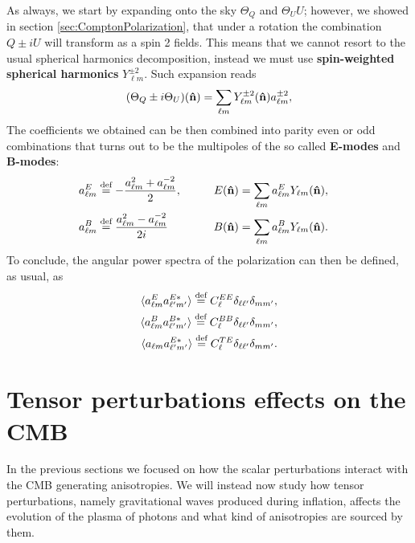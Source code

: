 As always, we start by expanding onto the sky $\Theta_Q$ and $\Theta_UU$; however, we showed in section \ref{sec:ComptonPolarization}, that under a rotation the combination $Q\pm iU$ will transform as a spin 2 fields. This means that we cannot resort to the usual spherical harmonics decomposition, instead we must use \textbf{spin-weighted spherical harmonics} $Y_{\ell m}^{\pm2}$. Such expansion reads
\begin{equation}
    (\Theta_Q\pm i\Theta_U)(\mathbf{\hat{n}})=\sum_{\ell m} Y^{\pm2}_{\ell m}(\mathbf{\hat{n}})a^{\pm2}_{\ell m} ,\label{eq:EB_sky_expansion}
\end{equation}
The coefficients we obtained can be then combined into parity even or odd combinations that turns out to be the multipoles of the so called \textbf{E-modes} and \textbf{B-modes}:
\begin{align*}
    a^E_{\ell m}&\stackrel{\text{def}}{=}-\frac{a^2_{\ell m}+a^{-2}_{\ell m}}{2},\qquad &E(\mathbf{\hat{n}})=\sum_{\ell m}a^E_{\ell m}Y_{\ell m}(\mathbf{\hat{n}}),&&\\ a^B_{\ell m}&\stackrel{\text{def}}{=}\frac{a^2_{\ell m}-a^{-2}_{\ell m}}{2i}
    \qquad &B(\mathbf{\hat{n}})=\sum_{\ell m}a^B_{\ell m}Y_{\ell m}(\mathbf{\hat{n}}).&&
\end{align*}
To conclude, the angular power spectra of the polarization can then be defined, as usual, as
\begin{subequations}
    \label{eq:PolPowerSpectrum}
\begin{align}
    \langle a^E_{\ell m}a^{E*}_{\ell' m'}\rangle\stackrel{\text{def}}{=} C_{\ell}^{EE}\delta_{\ell \ell'}\delta_{m m'},\\ \langle a^B_{\ell m}a^{B*}_{\ell' m'}\rangle\stackrel{\text{def}}{=} C_{\ell}^{BB}\delta_{\ell \ell'}\delta_{m m'},\\\langle a_{\ell m}a^{E*}_{\ell' m'}\rangle\stackrel{\text{def}}{=} C_{\ell}^{TE}\delta_{\ell \ell'}\delta_{m m'}.
\end{align}
\end{subequations}
\section{Tensor perturbations effects on the CMB}\label{sec:Anisotropies_From_Tensor}
In the previous sections we focused on how the scalar perturbations interact with the CMB generating anisotropies. We will instead now study how tensor perturbations, namely gravitational waves produced during inflation, affects the evolution of the plasma of photons and what kind of anisotropies are sourced by them.

